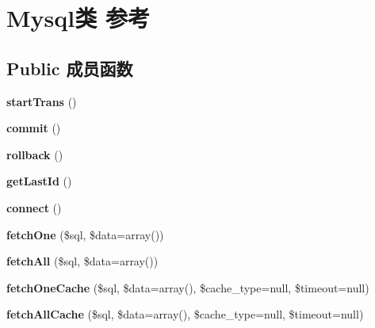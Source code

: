 \hypertarget{classMysql}{\section{Mysql类 参考}
\label{classMysql}
}
\subsection*{Public 成员函数}
\begin{DoxyCompactItemize}
\item 
\hypertarget{classMysql_a027cc590c4a4e1d14d5e23d48bd13730}{{\bfseries start\+Trans} ()}\label{classMysql_a027cc590c4a4e1d14d5e23d48bd13730}

\item 
\hypertarget{classMysql_a8c060ac3ceff4c0bfd997ad98629d9e3}{{\bfseries commit} ()}\label{classMysql_a8c060ac3ceff4c0bfd997ad98629d9e3}

\item 
\hypertarget{classMysql_aaa015899e4cfa5786c14e9f75c82ac56}{{\bfseries rollback} ()}\label{classMysql_aaa015899e4cfa5786c14e9f75c82ac56}

\item 
\hypertarget{classMysql_a5f3314dd13803ea06e3f9523bc147775}{{\bfseries get\+Last\+Id} ()}\label{classMysql_a5f3314dd13803ea06e3f9523bc147775}

\item 
\hypertarget{classMysql_a0a87c674a132fb336b59117ad309b803}{{\bfseries connect} ()}\label{classMysql_a0a87c674a132fb336b59117ad309b803}

\item 
\hypertarget{classMysql_abb962f400e67947b5fa28543c2230726}{{\bfseries fetch\+One} (\$sql, \$data=array())}\label{classMysql_abb962f400e67947b5fa28543c2230726}

\item 
\hypertarget{classMysql_a223b3de3bfbb58545d828931da44d25a}{{\bfseries fetch\+All} (\$sql, \$data=array())}\label{classMysql_a223b3de3bfbb58545d828931da44d25a}

\item 
\hypertarget{classMysql_a8db343074288f04ce9663e59b2a1459a}{{\bfseries fetch\+One\+Cache} (\$sql, \$data=array(), \$cache\+\_\+type=null, \$timeout=null)}\label{classMysql_a8db343074288f04ce9663e59b2a1459a}

\item 
\hypertarget{classMysql_a098f10417f2071dcb89b9afc9701089b}{{\bfseries fetch\+All\+Cache} (\$sql, \$data=array(), \$cache\+\_\+type=null, \$timeout=null)}\label{classMysql_a098f10417f2071dcb89b9afc9701089b}


\end{DoxyCompactItemize}
